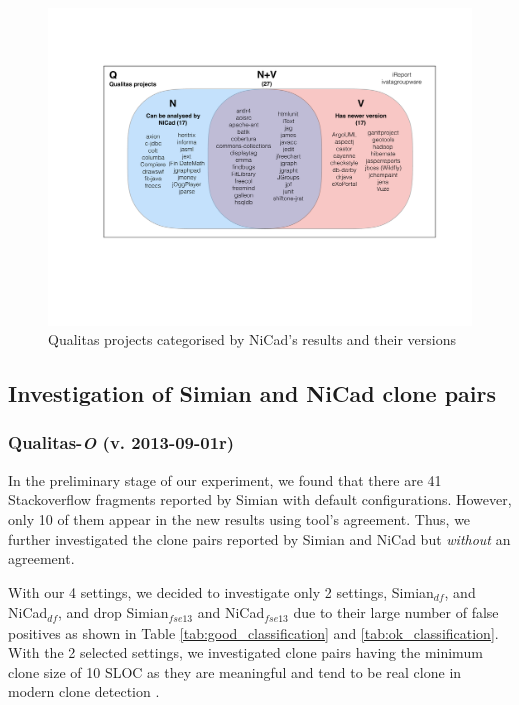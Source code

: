 \documentclass{IEEEtran}
\begin{document}
\begin{figure}
	\centering
	\includegraphics[width=0.7\linewidth]{n+v}
	\caption{Qualitas projects categorised by NiCad's results and their versions}
	\label{fig:n+v}
\end{figure}

\subsection{Investigation of Simian and NiCad clone pairs}
\subsubsection{Qualitas-\textit{O} (v. 2013-09-01r)}
In the preliminary stage of our experiment, we found that there are 41 Stackoverflow fragments reported by Simian with default configurations. However, only 10 of them appear in the new results using tool's agreement. Thus, we further investigated the clone pairs reported by Simian and NiCad but \textit{without} an agreement. 

With our 4 settings, we decided to investigate only 2 settings, Simian$_{\mathrm{\textit{df}}}$, and NiCad$_{\mathrm{\textit{df}}}$, and drop Simian$_{\mathrm{\textit{fse13}}}$ and NiCad$_{\mathrm{\textit{fse13}}}$ due to their large number of false positives as shown in Table \ref{tab:good_classification} and \ref{tab:ok_classification}. With the 2 selected settings, we investigated clone pairs having the minimum clone size of 10 SLOC as they are meaningful and tend to be real clone in modern clone detection \cite{Sajnani2016}. 
\end{document}
